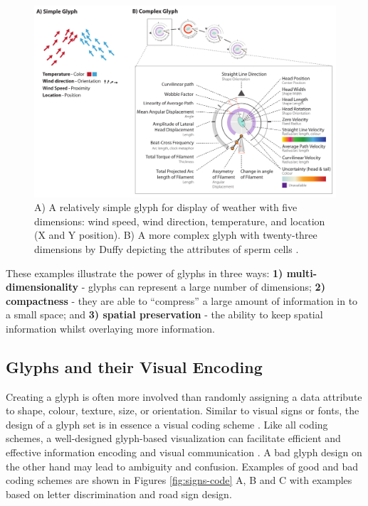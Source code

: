 \begin{figure}[t!]
\centering
\includegraphics[width=\textwidth]{images/related-work/glyphs/glyph-simple-complex}
\caption{A) A relatively simple glyph for display of weather with five dimensions: wind speed, wind direction, temperature, and location (X and Y position). B) A more complex glyph with twenty-three dimensions by Duffy \etal depicting the attributes of sperm cells \cite{Duffy:2014:TVCG}.}
\label{fig:glyphs-simple-complex}
\end{figure}

These examples illustrate the power of glyphs in three ways: \textbf{1) multi-dimensionality} - glyphs can represent a large number of dimensions; \textbf{2) compactness} - they are able to ``compress'' a large amount of information in to a small space; and
\textbf{3) spatial preservation} - the ability to keep spatial information whilst overlaying more information.


\subsection{Glyphs and their Visual Encoding}
\label{sec:mapping-glyph-data}

Creating a glyph is often more involved than randomly assigning a data attribute to shape, colour, texture, size, or orientation.
Similar to visual signs or fonts, the design of a glyph set is in essence a visual coding scheme \cite{Borgo:2013:EG}.
Like all coding schemes, a well-designed glyph-based visualization can facilitate efficient and effective information encoding and visual communication \cite{Borgo:2013:EG}. 
A bad glyph design on the other hand may lead to ambiguity and confusion. 
Examples of good and bad coding schemes are shown in Figures \ref{fig:signs-code} A, B and C with examples based on letter discrimination and road sign design. 

